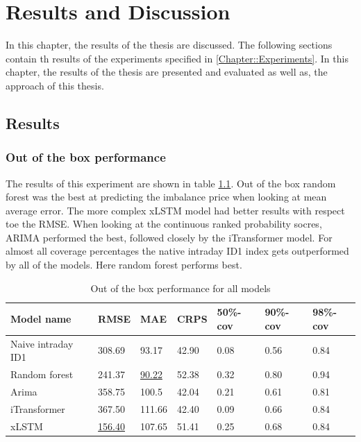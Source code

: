 \documentclass[class=scrbook, crop=false]{standalone}
\begin{document}
\chapter{Results and Discussion} %
\label{Chapter::Results and Discussion}
In this chapter, the results of the thesis are discussed. The following sections contain th results of the experiments specified in \ref{Chapter::Experiments}.                   
    In this chapter, the results of the thesis are presented and evaluated as well as, the approach of this thesis.

\section{Results}
\label{Section::Results}

\subsection{Out of the box performance}
  The results of this experiment are shown in table \ref{Table::Out_of_the_box_performance}.
  Out of the box random forest was the best at predicting the imbalance price when looking at mean average error.
  The more complex xLSTM model had better results with respect toe the RMSE. 
  When looking at the continuous ranked probability socres, ARIMA performed the best, followed closely by the iTransformer model.
  For almost all coverage percentages the native intraday ID1 index gets outperformed by all of the models.
  Here random forest performs best.
  
  \begin{table}[]
\centering
\begin{tabular}{l|l|l|l|l|l|l}
Model name 		&  RMSE 	& MAE 	& CRPS 	& 50\%-cov 	& 90\%-cov 	& 98\%-cov \\\hline
Naive intraday ID1 	& 308.69 	& 93.17 	& 42.90 	& 0.08 		& 0.56 		& 0.84 \\
Random forest 		& 241.37	&   \underline{90.22} 	& 52.38 	& 0.32 		& 0.80 		& 0.94 \\
Arima 			& 358.75 	& 100.5 	& 42.04  	& 0.21 		& 0.61 		& 0.81 \\	
iTransformer 		& 367.50 	& 111.66 	& 42.40 	& 0.09 		& 0.66 		& 0.84 \\
xLSTM 			&  \underline{156.40} 	& 107.65 	& 51.41 	& 0.25 		& 0.68 		& 0.84 \\
\end{tabular}
\caption{Out of the box performance for all models}
\label{Table::Out_of_the_box_performance}
\end{table}
\end{document}
